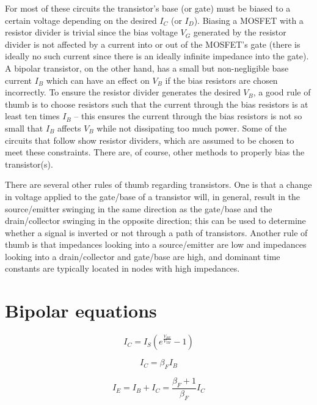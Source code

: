 For most of these circuits the transistor's base (or gate) must be biased to a certain \DC voltage depending on the desired $I_{C}$ (or $I_{D}$). Biasing a MOSFET with a resistor divider is trivial since the bias voltage $V_{G}$ generated by the resistor divider is not affected by a current into or out of the MOSFET's gate (there is ideally no such current since there is an ideally infinite impedance into the gate).
A bipolar transistor, on the other hand, has a small but non-negligible base current $I_{B}$ which can have an effect on $V_{B}$ if the bias resistors are chosen incorrectly.
To ensure the resistor divider generates the desired $V_{B}$, a good rule of thumb is to choose resistors such that the current through the bias resistors is at least ten times $I_{B}$ -- this ensures the current through the bias resistors is not so small that $I_{B}$ affects $V_{B}$ while not dissipating too much power.
Some of the circuits that follow show resistor dividers, which are assumed to be chosen to meet these constraints.
There are, of course, other methods to properly bias the transistor(s).

There are several other rules of thumb regarding transistors.
One is that a change in voltage applied to the gate/base of a transistor will, in general, result in the source/emitter swinging in the same direction as the gate/base and the drain/collector swinging in the opposite direction;
this can be used to determine whether a signal is inverted or not through a path of transistors.
Another rule of thumb is that impedances looking into a source/emitter are low and impedances looking into a drain/collector and gate/base are high, and dominant time constants are typically located in nodes with high impedances.

\section*{Bipolar equations}
\begin{equation}
I_{C} = I_{S}\left(e^{\frac{V_{BE}}{V_{TH}}}-1\right)
\label{eq:bipolarIc}
\end{equation}

\begin{equation}
I_{C} = \beta_{F}I_{B}
\label{eq:bipolarIcwrtIb}
\end{equation}

\begin{equation}
I_{E} = I_{B} + I_{C} = \frac{\beta_{F}+1}{\beta_{F}}I_{C}
\label{eq:bipolarIewrtIc}
\end{equation}

